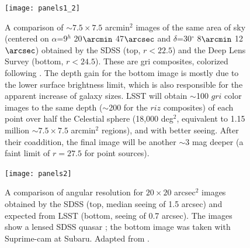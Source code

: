 \begin{figure}
\begin{center}
\texttt{[image: panels1\_2]}
\end{center}
\caption{A comparison of $\sim7.5\times7.5$ arcmin$^2$ images of
the same area of sky (centered on $\alpha$=9$^h$ 20$\arcmin$ 47$\arcsec$ and
$\delta$=30$^\circ$ 8$\arcmin$ 12$\arcsec$) obtained by the SDSS (top, $r<22.5$) and
the Deep Lens Survey (bottom, $r<24.5$). These are gri composites,
colorized following \citet{2004PASP..116..133L}.  The depth gain for the bottom image
is mostly due to the lower surface brightness limit, which is also responsible
for the apparent increase of galaxy sizes. LSST will obtain $\sim$100 $gri$
color images to the same depth ($\sim$200 for the $riz$ composites) of each point
over half the Celestial sphere (18,000 deg$^2$, equivalent to 1.15 million $\sim7.5\times7.5$
arcmin$^2$ regions), and with better seeing. After their coaddition, the final
image will be another $\sim3$ mag deeper (a faint limit of $r=27.5$ for point
sources).}
\label{Fig:panels1}
\end{figure}

\begin{figure}
\begin{center}
\texttt{[image: panels2]}
\end{center}
\caption{A comparison of angular resolution for $20\times20$ arcsec$^2$ images obtained
by the SDSS (top, median seeing of 1.5 arcsec) and expected from LSST (bottom,
seeing of 0.7 arcsec). The images show a lensed SDSS quasar
\citep[SDSS J1332+0347,][]{2007AJ....133..214M}; the bottom image was taken with Suprime-cam at Subaru.
Adapted from \citet{2007AAS...21113707B}.}
\label{Fig:panels2}
\end{figure}
